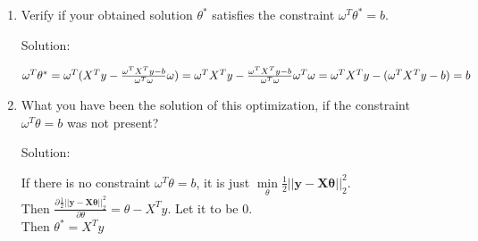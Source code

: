 \documentclass[12pt]{article}
\newcommand{\solu}{{\color{blue} Solution:}}
\begin{document}
\begin{enumerate}
\begin{enumerate}
            \item Verify if your obtained solution $\theta^*$ satisfies the constraint $\omega^T\theta^* = b$.
            
            \solu

            $\omega^T \theta^* \\
            = \omega^T(X^Ty - \frac{\omega^TX^T y - b}{\omega^T \omega} \omega)\\
            = \omega^TX^Ty - \frac{\omega^TX^T y - b}{\omega^T \omega} \omega^T \omega\\
            = \omega^TX^Ty - (\omega^TX^T y - b)\\
            = b$

            \item What you have been the solution of this optimization, if the constraint $\omega^T\theta = b$ was not present?
            
            \solu 

            If there is no constraint $\omega^T\theta = b$, it is just $\min\limits_\theta \frac{1}{2}||\mathbf{y} - \mathbf{X\theta}||^2_2$.\\
            Then $\frac{\partial \frac{1}{2}||\mathbf{y} - \mathbf{X\theta}||^2_2}{\partial \theta} = \theta - X^Ty$. Let it to be 0.\\
            Then $\theta^* = X^Ty$


            

        \end{enumerate}
    \end{enumerate}    
\end{document}
